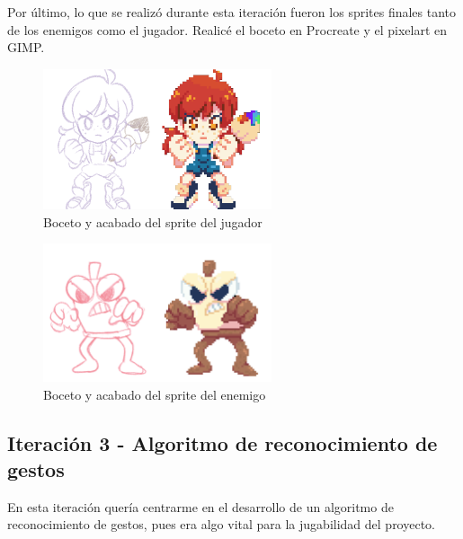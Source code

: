 \vspace{0.5cm}

Por último, lo que se realizó durante esta iteración fueron los sprites finales tanto de los enemigos como el jugador. Realicé el boceto en Procreate y el pixelart en GIMP.

\vspace{0.5cm}

\begin{figure}[htbp]
\centering
  \includegraphics[width=0.6\textwidth]{archivos/sprite_player.png}
  \caption{Boceto y acabado del sprite del jugador}
  \label{fig:sprite_player}
\end{figure}

\vspace{0.5cm}

\begin{figure}[htbp]
\centering
  \includegraphics[width=0.6\textwidth]{archivos/sprite_enemy.png}
  \caption{Boceto y acabado del sprite del enemigo}
  \label{fig:sprite_enemy}
\end{figure}

\subsection{Iteración 3 - Algoritmo de reconocimiento de gestos}

En esta iteración quería centrarme en el desarrollo de un algoritmo de reconocimiento de gestos, pues era algo vital para la jugabilidad del proyecto.

\vspace{0.5cm}

